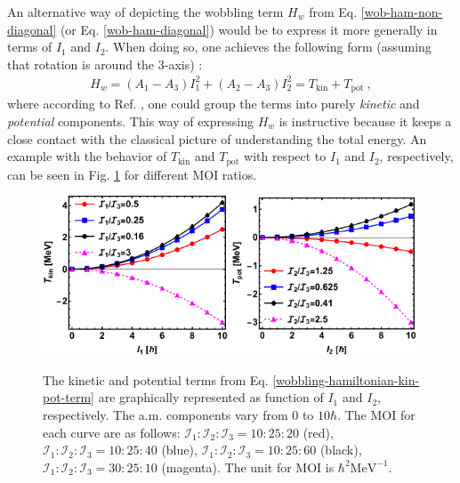An alternative way of depicting the wobbling term $H_w$ from Eq. \ref{wob-ham-non-diagonal} (or Eq. \ref{wob-ham-diagonal}) would be to express it more generally in terms of $I_1$ and $I_2$. When doing so, one achieves the following form (assuming that rotation is around the $3$-axis) \cite{oi2006semi}:
\begin{align}
    H_w=(A_1-A_3)I_1^2+(A_2-A_3)I_2^2=T_\text{kin}+T_\text{pot}\ ,
    \label{wobbling-hamiltonian-kin-pot-term}
\end{align}
where according to Ref. \cite{wen2015wobbling}, one could group the terms into purely \emph{kinetic} and \emph{potential} components. This way of expressing $H_w$ is instructive because it keeps a close contact with the classical picture of understanding the total energy. An example with the behavior of $T_\text{kin}$ and $T_\text{pot}$ with respect to $I_1$ and $I_2$, respectively, can be seen in Fig. \ref{kin-pot-wobbling-ham-example} for different MOI ratios.
\begin{figure}
    \centering
    \includegraphics[width=0.49\textwidth]{Chapters/Figures/kin-pot-terms.pdf}
    \includegraphics[width=0.49\textwidth]{Chapters/Figures/kin-pot-terms-2.pdf}
    \caption{The kinetic and potential terms from Eq. \ref{wobbling-hamiltonian-kin-pot-term} are graphically represented as function of $I_1$ and $I_2$, respectively. The a.m. components vary from $0$ to $10\hbar$. The MOI for each curve are as follows: $\mathcal{I}_1:\mathcal{I}_2:\mathcal{I}_3=10:25:20$ (red), $\mathcal{I}_1:\mathcal{I}_2:\mathcal{I}_3=10:25:40$ (blue), $\mathcal{I}_1:\mathcal{I}_2:\mathcal{I}_3=10:25:60$ (black), $\mathcal{I}_1:\mathcal{I}_2:\mathcal{I}_3=30:25:10$ (magenta). The unit for MOI is $\hbar^2\text{MeV}^{-1}$.}
    \label{kin-pot-wobbling-ham-example}
\end{figure}


